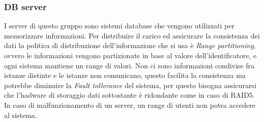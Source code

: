\subsubsection{DB server}
I server di questo gruppo sono sistemi database che vengono utilizzati per memorizzare informazioni.%
Per distribuire il carico ed assicurare la consistenza dei dati la politica di distribuzione dell'informazione che si usa \`e \emph{Range partitioning}, ovvero le informazioni vengono partizionate in base al valore dell'identificatore, e ogni sistema mantiene un range di valori.
Non ci sono informazioni condivise fra istanze distinte e le istanze non comunicano, questo facilita la consistenza ma potrebbe diminuire la \emph{Fault tollerance} del sistema, per questo bisogna assicurarsi che l'hadware di storaggio dati sottostante \`e ridondante come in caso di RAID5.
In caso di malfunzionamento di un server, un range di utenti non potra accedere al sistema.

